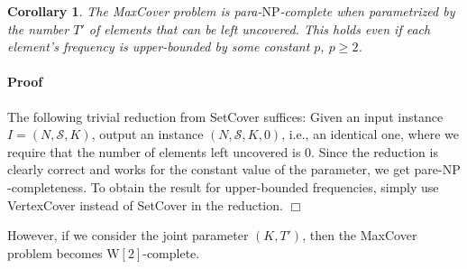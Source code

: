 \documentclass[11pt]{article}
\newtheorem{corollary}[theorem]{Corollary}
\newenvironment{proof}{\paragraph{Proof}}{\hfill$\Box$\medskip}
\newcommand{\np}{{\mathrm{NP}}}
\newcommand{\wtwo}{{\mathrm{W[2]}}}
\newcommand{\calS}{{{\mathcal{S}}}}
\begin{document}
\begin{corollary}\label{cor:teqzero}
  The MaxCover problem is para-$\np$-complete when parametrized by the
  number $T'$ of elements that can be left uncovered. This holds even
  if each element's frequency is upper-bounded by some constant $p$,
  $p \geq 2$.
\end{corollary}
\begin{proof}
  The following trivial reduction from SetCover suffices: Given an
  input instance $I = (N,\calS,K)$, output an instance
  $(N,\calS,K,0)$, i.e., an identical one, where we require that the
  number of elements left uncovered is $0$. Since the reduction is
  clearly correct and works for the constant value of the parameter,
  we get pare-$\np$-completeness. To obtain the result for upper-bounded frequencies,
  simply use VertexCover instead of SetCover in the reduction.
\end{proof}

However, if we consider the joint parameter $(K,T')$, then the
MaxCover problem becomes $\wtwo$-complete.
\end{document}
